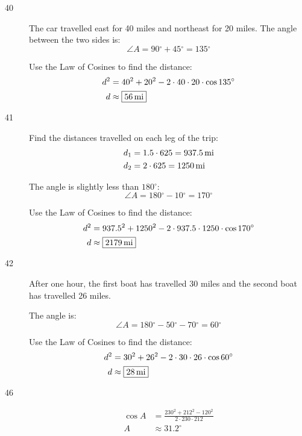 \documentclass{exam}
\newcommand{\dg}{\ensuremath{^\circ}}
\begin{document}
\begin{description}
      \item[40]
        The car travelled east for 40 miles and northeast for 20 miles.  The angle between the two sides is:
        \[
          \angle A = 90 \dg + 45 \dg = 135 \dg
        \]

        Use the Law of Cosines to find the distance:
        \begin{align*}
          d^2 & = 40^2 + 20^2 - 2 \cdot 40 \cdot 20 \cdot \cos 135 \dg \\
          d   & \approx \boxed{ \unit[56]{mi} } \\
        \end{align*}

      \item[41]
        Find the distances travelled on each leg of the trip:
        \begin{align*}
          d_1 &= 1.5 \cdot 625 = \unit[937.5]{mi} \\
          d_2 &= 2 \cdot 625 = \unit[1250]{mi} \\
        \end{align*}

        The angle is slightly less than $180 \dg$:
        \[
          \angle A = 180 \dg - 10 \dg = 170 \dg
        \]

        Use the Law of Cosines to find the distance:
        \begin{align*}
          d^2 & = 937.5^2 + 1250^2 - 2 \cdot 937.5 \cdot 1250 \cdot \cos 170 \dg \\
          d   & \approx \boxed{ \unit[2179]{mi} } \\
        \end{align*}

      \item[42]
        After one hour, the first boat has travelled 30 miles and the second boat has travelled 26 miles.

        The angle is:
        \[
          \angle A = 180 \dg - 50 \dg - 70 \dg = 60 \dg
        \]

        Use the Law of Cosines to find the distance:
        \begin{align*}
          d^2 & = 30^2 + 26^2 - 2 \cdot 30 \cdot 26 \cdot \cos 60 \dg \\
          d   & \approx \boxed{ \unit[28]{mi} } \\
        \end{align*}

      \item[46]
        \begin{align*}
          \cos A & = \frac{230^2 + 212^2 - 120^2}{2 \cdot 230 \cdot 212} \\
          A      & \approx 31.2 \dg \\
        \end{align*}


\end{description}
\end{document}
